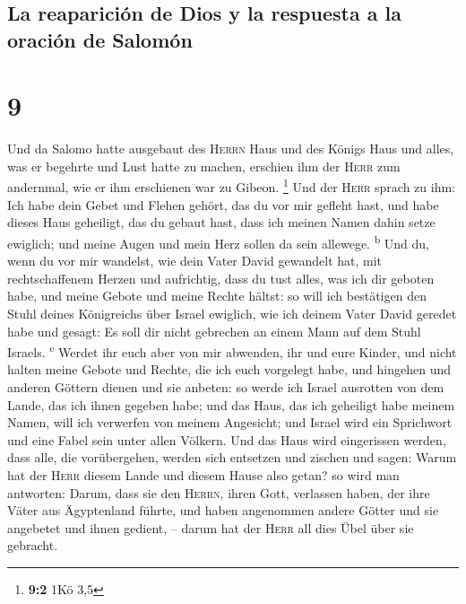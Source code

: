 \hypertarget{la-reapariciuxf3n-de-dios-y-la-respuesta-a-la-oraciuxf3n-de-salomuxf3n}{%
\subsection{La reaparición de Dios y la respuesta a la oración de
Salomón}\label{la-reapariciuxf3n-de-dios-y-la-respuesta-a-la-oraciuxf3n-de-salomuxf3n}}

\hypertarget{section-8}{%
\section{9}\label{section-8}}

 Und da Salomo hatte ausgebaut des \textsc{Herrn} Haus und
des Königs Haus und alles, was er begehrte und Lust hatte zu machen,
 erschien ihm der \textsc{Herr} zum andernmal, wie er ihm
erschienen war zu Gibeon. \footnote{\textbf{9:2} 1Kö 3,5} 
Und der \textsc{Herr} sprach zu ihm: Ich habe dein Gebet und Flehen
gehört, das du vor mir gefleht hast, und habe dieses Haus geheiligt, das
du gebaut hast, dass ich meinen Namen dahin setze ewiglich; und meine
Augen und mein Herz sollen da sein allewege. \textsuperscript{b}
 Und du, wenn du vor mir wandelst, wie dein Vater David
gewandelt hat, mit rechtschaffenem Herzen und aufrichtig, dass du tust
alles, was ich dir geboten habe, und meine Gebote und meine Rechte
hältst:  so will ich bestätigen den Stuhl deines
Königreichs über Israel ewiglich, wie ich deinem Vater David geredet
habe und gesagt: Es soll dir nicht gebrechen an einem Mann auf dem Stuhl
Israels. \textsuperscript{c}  Werdet ihr euch aber von mir
abwenden, ihr und eure Kinder, und nicht halten meine Gebote und Rechte,
die ich euch vorgelegt habe, und hingehen und anderen Göttern dienen und
sie anbeten:  so werde ich Israel ausrotten von dem Lande,
das ich ihnen gegeben habe; und das Haus, das ich geheiligt habe meinem
Namen, will ich verwerfen von meinem Angesicht; und Israel wird ein
Sprichwort und eine Fabel sein unter allen Völkern.  Und
das Haus wird eingerissen werden, dass alle, die vorübergehen, werden
sich entsetzen und zischen und sagen: Warum hat der \textsc{Herr} diesem
Lande und diesem Hause also getan?  so wird man antworten:
Darum, dass sie den \textsc{Herrn}, ihren Gott, verlassen haben, der
ihre Väter aus Ägyptenland führte, und haben angenommen andere Götter
und sie angebetet und ihnen gedient, -- darum hat der \textsc{Herr} all
dies Übel über sie gebracht.

